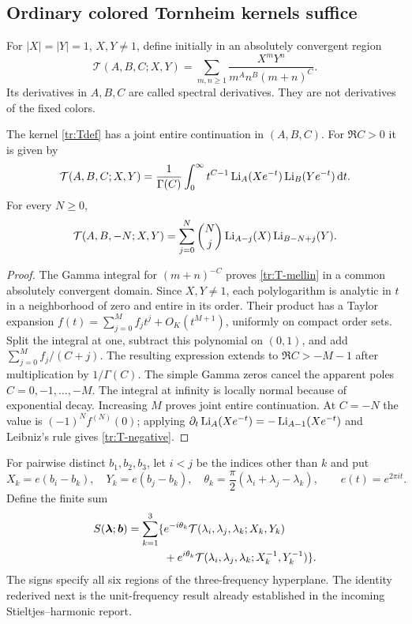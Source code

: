 \subsection{Ordinary colored Tornheim kernels suffice}
For $|X|=|Y|=1$, $X,Y\ne1$, define initially in an absolutely convergent
region
\begin{equation}\label{tr:Tdef}
 \mathcal T(A,B,C;X,Y)
     =\sum_{m,n\geq1}\frac{X^mY^n}{m^An^B(m+n)^C}.
\end{equation}
Its derivatives in $A,B,C$ are called spectral derivatives. They are
not derivatives of the fixed colors.

\begin{lemma}
\label{tr:T-entire}
The kernel \eqref{tr:Tdef} has a joint entire continuation in
$(A,B,C)$. For $\Re C>0$ it is given by
\begin{equation}\label{tr:T-mellin}
 \mathcal T(A,B,C;X,Y)=\frac1{\Gamma(C)}
   \int_0^\infty t^{C-1}\operatorname{Li}_A(Xe^{-t})\operatorname{Li}_B(Ye^{-t})\,\mathrm d t.
\end{equation}
For every $N\geq0$,
\begin{equation}\label{tr:T-negative}
 \mathcal T(A,B,-N;X,Y)
   =\sum_{j=0}^N\binom Nj\operatorname{Li}_{A-j}(X)\operatorname{Li}_{B-N+j}(Y).
\end{equation}
\end{lemma}
\begin{proof}
The Gamma integral for $(m+n)^{-C}$ proves \eqref{tr:T-mellin} in a
common absolutely convergent domain. Since $X,Y\ne1$, each
polylogarithm is analytic in $t$ in a neighborhood of zero and entire
in its order. Their product has a Taylor expansion
$f(t)=\sum_{j=0}^Mf_jt^j+O_K(t^{M+1})$, uniformly on compact order
sets. Split the integral at one, subtract this polynomial on $(0,1)$,
and add $\sum_{j=0}^Mf_j/(C+j)$. The resulting expression extends to
$\Re C>-M-1$ after multiplication by $1/\Gamma(C)$. The simple Gamma
zeros cancel the apparent poles $C=0,-1,\ldots,-M$. The integral at
infinity is locally normal because of exponential decay. Increasing
$M$ proves joint entire continuation. At $C=-N$ the value is
$(-1)^Nf^{(N)}(0)$; applying
$\partial_t\operatorname{Li}_A(Xe^{-t})=-\operatorname{Li}_{A-1}(Xe^{-t})$ and Leibniz's rule
gives \eqref{tr:T-negative}.
\end{proof}

For pairwise distinct $b_1,b_2,b_3$, let $i<j$ be the indices other
than $k$ and put
\[
 X_k=e(b_i-b_k),\quad Y_k=e(b_j-b_k),\quad
 \theta_k=\frac\pi2(\lambda_i+\lambda_j-\lambda_k),
 \qquad e(t)=e^{2\pi it}.
\]
Define the finite sum
\begin{align}\label{tr:Sdef}
 S(\boldsymbol\lambda;\boldsymbol b)
 =\sum_{k=1}^3\{&e^{-i\theta_k}
      \mathcal T(\lambda_i,\lambda_j,\lambda_k;X_k,Y_k)\notag\\
 &+e^{i\theta_k}
      \mathcal T(\lambda_i,\lambda_j,\lambda_k;X_k^{-1},Y_k^{-1})\}.
\end{align}
The signs specify all six regions of the three-frequency hyperplane.
The identity rederived next is the unit-frequency result already
established in the incoming Stieltjes--harmonic report.

